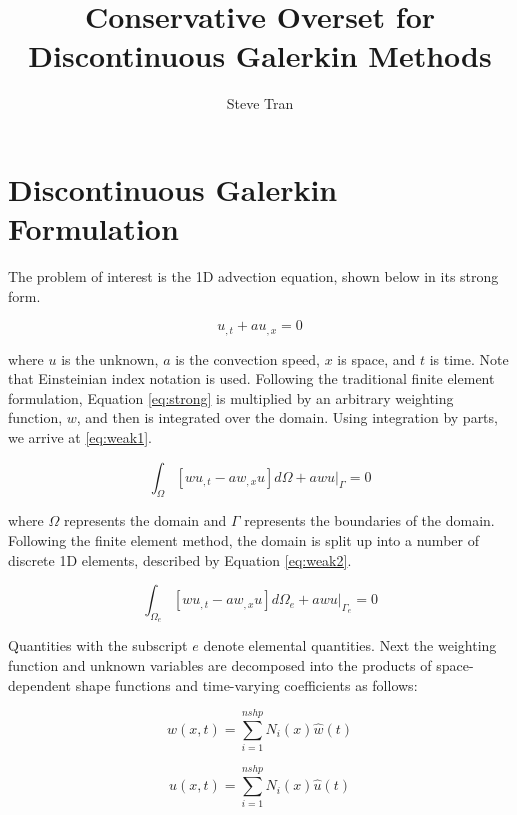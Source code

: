 \documentclass[11pt]{article}
\begin{document}
\title{Conservative Overset for Discontinuous Galerkin Methods}
\author{Steve Tran}
\maketitle

\section{Discontinuous Galerkin Formulation}

The problem of interest is the 1D advection equation, shown below in its strong form. 

\begin{equation} 
  u_{,t} + a u_{,x} = 0
  \label{eq:strong}
\end{equation}

\noindent where $u$ is the unknown, $a$ is the convection speed, $x$ is space, and $t$ is time. 
Note that Einsteinian index notation is used. 
Following the traditional finite element formulation, Equation \eqref{eq:strong}
is multiplied by an arbitrary weighting function, $w$, and then is integrated over the domain. 
Using integration by parts, we arrive at  \eqref{eq:weak1}. 

\begin{equation}
\int_\Omega \left[ w u_{,t} - a w_{,x} u \right ]d\Omega + a w u |_\Gamma= 0
\label{eq:weak1}
\end{equation}

\noindent where $\Omega$ represents the domain and $\Gamma$ represents the boundaries of 
the domain. Following the finite element method, the domain is split up into a number of
discrete 1D elements, described by Equation \eqref{eq:weak2}. 

\begin{equation}
\int_{\Omega_e} \left[ w u_{,t} - a w_{,x} u \right ]d{\Omega_e} + a w u|_{\Gamma_e}= 0
\label{eq:weak2}
\end{equation}

\noindent Quantities with the subscript $e$ denote elemental quantities. Next the
weighting function and unknown variables are decomposed into the products of
space-dependent shape functions and time-varying coefficients as follows:

\begin{equation}
w(x,t) = \sum_{i=1}^{nshp} N_i(x) \hat{w}(t)
\end{equation}

\begin{equation}
u(x,t) = \sum_{i=1}^{nshp} N_i(x) \hat{u}(t)
\label{eq:shape}
\end{equation}
\end{document}
